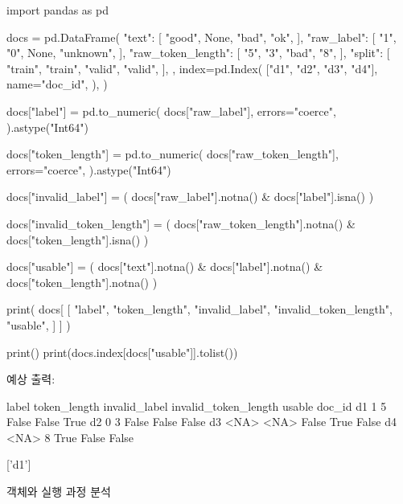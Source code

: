 \begin{dhkcode}
import pandas as pd

docs = pd.DataFrame(
    {
        "text": [
            "good",
            None,
            "bad",
            "ok",
        ],
        "raw_label": [
            "1",
            "0",
            None,
            "unknown",
        ],
        "raw_token_length": [
            "5",
            "3",
            "bad",
            "8",
        ],
        "split": [
            "train",
            "train",
            "valid",
            "valid",
        ],
    },
    index=pd.Index(
        ["d1", "d2", "d3", "d4"],
        name="doc_id",
    ),
)

docs["label"] = pd.to_numeric(
    docs["raw_label"],
    errors="coerce",
).astype("Int64")

docs["token_length"] = pd.to_numeric(
    docs["raw_token_length"],
    errors="coerce",
).astype("Int64")

docs["invalid_label"] = (
    docs["raw_label"].notna()
    & docs["label"].isna()
)

docs["invalid_token_length"] = (
    docs["raw_token_length"].notna()
    & docs["token_length"].isna()
)

docs["usable"] = (
    docs["text"].notna()
    & docs["label"].notna()
    & docs["token_length"].notna()
)

print(
    docs[
        [
            "label",
            "token_length",
            "invalid_label",
            "invalid_token_length",
            "usable",
        ]
    ]
)

print()
print(docs.index[docs["usable"]].tolist())
\end{dhkcode}

예상 출력:

\begin{dhkzsh}
        label  token_length  invalid_label  invalid_token_length  usable
doc_id
d1          1             5          False                 False    True
d2          0             3          False                 False   False
d3       <NA>          <NA>          False                  True   False
d4       <NA>             8           True                 False   False

['d1']
\end{dhkzsh}

\begin{dhknote}
\begin{dhksmry}[centered]
객체와 실행 과정 분석
\end{dhksmry}
\end{dhknote}

